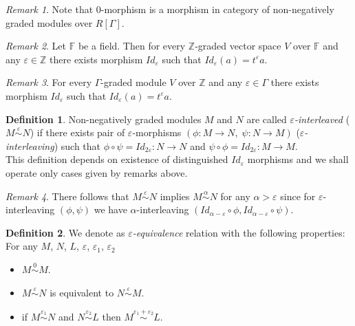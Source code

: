 \documentclass[a4paper, 12pt]{article}
\theoremstyle{definition}
\newtheorem{definition}{Definition}
\theoremstyle{remark}
\newtheorem{remark}{Remark}
\newcommand{\define}[1]{{\textit{#1}}}
\begin{document}
\begin{remark}
  Note that $0$-morphism is a morphism in category of non-negatively graded modules over $R[\Gamma]$.
\end{remark}

\begin{remark}
  Let $\mathbb{F}$ be a field. Then for every $\mathbb{Z}$-graded vector space $V$ over $\mathbb{F}$ and any $\varepsilon \in \mathbb{Z}$ there exists morphism $Id_{\varepsilon}$ such that $Id_{\varepsilon}(a) = t^{\varepsilon}a$.
\end{remark}

\begin{remark}
  For every $\Gamma$-graded module $V$ over $\mathbb{Z}$ and any $\varepsilon \in \Gamma$ there exists morphism $Id_{\varepsilon}$ such that $Id_{\varepsilon}(a) = t^{\varepsilon}a$.
\end{remark}

\begin{definition}
  Non-negatively graded modules $M$ and $N$ are called \define{$\varepsilon$-interleaved} ($M \stackrel{\varepsilon}{\sim} N$) if there exists pair of $\varepsilon$-morphisms $(\phi : M \to N,\;\psi : N \to M)$ (\define{$\varepsilon$-interleaving}) such that $\phi \circ \psi = Id_{2\varepsilon} : N \to N$ and $\psi \circ \phi = Id_{2\varepsilon} : M \to M$.\\

  This definition depends on existence of distinguished $Id_{\varepsilon}$ morphisms and we shall operate only cases given by remarks above.
\end{definition}

\begin{remark}
There follows that $M \stackrel{\varepsilon}{\sim} N$ implies $M \stackrel{\alpha}{\sim} N$ for any $\alpha > \varepsilon$ since for $\varepsilon$-interleaving $(\phi, \psi)$ we have $\alpha$-interleaving $(Id_{\alpha - \varepsilon} \circ \phi, Id_{\alpha - \varepsilon} \circ \psi)$.
\end{remark}

\begin{definition}
  We denote as \define{$\varepsilon$-equivalence} relation with the following properties:\\
  For any $M$, $N$, $L$, $\varepsilon$, $\varepsilon_1$, $\varepsilon_2$
  \begin{itemize}
    \item $M \stackrel{0}{\sim} M$.
    \item $M \stackrel{\varepsilon}{\sim} N$ is equivalent to $N \stackrel{\varepsilon}{\sim} M$.
    \item if $M \stackrel{\varepsilon_1}{\sim} N$ and $N \stackrel{\varepsilon_2}{\sim} L$ then $M \stackrel{\varepsilon_1 + \varepsilon_2}{\sim} L$.
  \end{itemize}
\end{definition}
\end{document}

